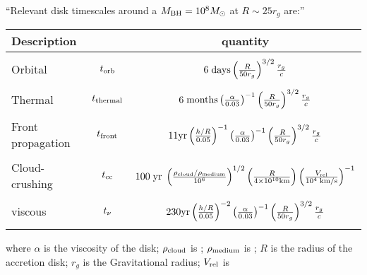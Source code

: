 \documentclass[11pt,a4paper]{article}
\begin{document}
``Relevant disk timescales around a $M_{\rm BH} = 10^{8} M_{\odot}$ at $R\sim 25r_{g}$ are:''
\begin{table}
  \centering
  \begin{tabular}{ l c c }
\hline \hline
    Description           &                             & quantity \\
\hline  
&& \\
Orbital                      & $t_{\rm orb}$          &  $6\; {\rm days}
                                                                     \left( \frac{R}{50 r_{g}}  \right)^{3/2}
                                                                     \frac{ r_{g}}{c}$\\
&& \\
Thermal                    &  $t_{\rm thermal}$    &  $6 \; {\rm months} 
                                                                        \left( \frac{\alpha}{0.03}  \right)^{-1}
                                                                        \left( \frac{R}{50 r_{g}}  \right)^{3/2}
                                                                         \frac{ r_{g}}{c}  $ \\
&& \\
Front propagation   & $t_{\rm front}$             & $11 {\rm yr}
                                                                         \left( \frac{h/R}{0.05}  \right)^{-1}
                                                                         \left( \frac{\alpha}{0.03}  \right)^{-1}
                                                                        \left( \frac{R}{50 r_{g}}  \right)^{3/2}
                                                                      \frac{ r_{g}}{c}$\\
&& \\
 Cloud-crushing      &  $t_{\rm cc}$             &   $100\; {\rm yr} \; 
                                                                       \left(  \frac{  \rho_{\rm cloud}/\rho_{\rm medium}}{10^6}  \right )^{1/2} 
                                                                       \left( \frac{R}{4\times10^{10} \rm{km}} \right)
                                                                     \left(\frac{V_{\rm rel}}{10^4 {\rm \; km/s }} \right)^{-1} $\\
&& \\
viscous                     & $t_{\rm \nu}$             & $230 {\rm yr}
                                                                         \left( \frac{h/R}{0.05}  \right)^{-2}
                                                                         \left( \frac{\alpha}{0.03}  \right)^{-1}
                                                                        \left( \frac{R}{50 r_{g}}  \right)^{3/2}
                                                                      \frac{ r_{g}}{c}$\\
&& \\
\hline \hline
    \end{tabular}
    \centering
  \end{table}
where 
$\alpha$ is the viscosity of the disk; 
$\rho_{\rm cloud}$ is ;
$\rho_{\rm medium}$ is  ;
$R$ is the radius of the accretion disk; 
$r_{g}$ is the Gravitational radius; 
$V_{\rm rel}$ is
\end{document}
